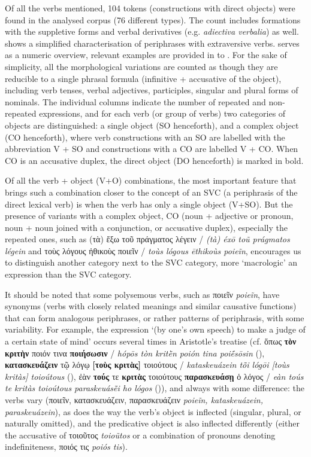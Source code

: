 \documentclass[output=paper,colorlinks,citecolor=brown]{langscibook}
\begin{document}
Of all the verbs mentioned, 104 tokens (constructions with direct objects) were found in the analysed corpus (76 different types). The count includes formations with the suppletive forms and verbal derivatives (e.g. \textit{adiectiva verbalia}) as well.  shows a simplified characterisation of periphrases with extraversive verbs.  
 serves as a numeric overview, relevant examples are provided in  to .
For the sake of simplicity, all the morphological variations are counted as though they are reducible to a single phrasal formula (infinitive + accusative of the object), including verb tenses, verbal adjectives, participles, singular and plural forms of nominals. The individual columns indicate the number of repeated and non-repeated expressions, and for each verb (or group of verbs) two categories of objects are distinguished: a single object (SO henceforth), and a complex object (CO henceforth), where verb constructions with an SO are labelled with the abbreviation V + SO and constructions with a CO are labelled V + CO. When CO is an accusative duplex, the direct object (DO henceforth) is marked in bold.



Of all the verb + object (V+O) combinations, the most important feature that brings such a combination closer to the concept of an SVC (a periphrasis of the direct lexical verb) is when the verb has only a single object (V+SO). But the presence of variants with a complex object, CO (noun + adjective or pronoun, noun + noun joined with a conjunction, or accusative duplex), especially the repeated ones, such as (τὰ) ἔξω τοῦ πράγματος λέγειν / \textit{(tà) éxō toũ prágmatos légein} and τοὺς λόγους ἠθικοὺς ποιεῖν / \textit{toùs lógous ēthikoùs poieĩn}, encourages us to distinguish another category next to the SVC category, more ‘macrologic’ an expression than the SVC category.

It should be noted that some polysemous verbs, such as ποιεῖν \textit{poieĩn}, have synonyms (verbs with closely related meanings and similar causative functions) that can form analogous periphrases, or rather patterns of periphrasis, with some variability. For example, the expression ‘(by one’s own speech) to make a judge of a certain state of mind' occurs several times in Aristotle’s treatise (cf. ὅπως \textbf{τὸν κριτὴν} ποιόν τινα \textbf{ποιήσωσιν} / \textit{hópōs tòn kritḕn poión tina poiḗsōsin} (), \textbf{κατασκευάζειν} τῷ λόγῳ \textbf{[τοὺς κριτὰς]} τοιούτους / \textit{kataskeuázein tō̃i lógōi [toùs kritàs] toioútous} (), ἐὰν \textbf{τούς} τε \textbf{κριτὰς} τοιούτους \textbf{παρασκευάσῃ} ὁ λόγος / \textit{eàn toús te kritàs toioútous paraskeuásē̃i ho lógos} ()), and always with some difference: the verbs vary (ποιεῖν, κατασκευάζειν, παρασκευάζειν \textit{poieĩn, kataskeuázein, paraskeuázein}), as does the way the verb’s object is inflected (singular, plural, or naturally omitted), and the predicative object is also inflected differently (either the accusative of τοιοῦτος \textit{toioũtos} or a combination of pronouns denoting indefiniteness, ποιός τις \textit{poiós tis}).
\end{document}

